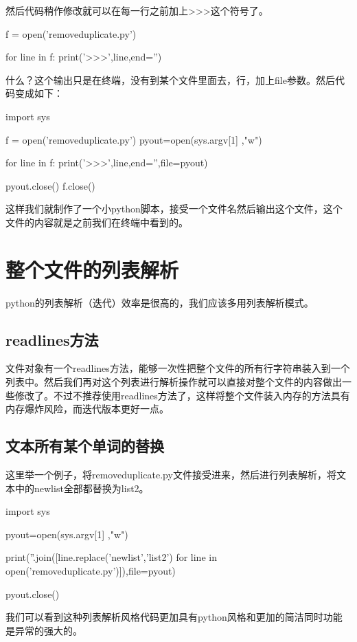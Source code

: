 \documentclass[12pt,oneside]{book}
\begin{document}
\begin{common-format}
然后代码稍作修改就可以在每一行之前加上>>>这个符号了。 
\begin{tcbpython}
f = open('removeduplicate.py')

for line in f:
    print('>>>',line,end='')
\end{tcbpython}

什么？这个输出只是在终端，没有到某个文件里面去，行，加上file参数。然后代码变成如下：
\begin{tcbpython}
import sys

f = open('removeduplicate.py')
pyout=open(sys.argv[1] ,"w")

for line in f:
    print('>>>',line,end='',file=pyout)

pyout.close()
f.close()
\end{tcbpython}
这样我们就制作了一个小python脚本，接受一个文件名然后输出这个文件，这个文件的内容就是之前我们在终端中看到的。

\section{整个文件的列表解析}
python的列表解析（迭代）效率是很高的，我们应该多用列表解析模式。

\subsection{readlines方法}
文件对象有一个readlines方法，能够一次性把整个文件的所有行字符串装入到一个列表中。然后我们再对这个列表进行解析操作就可以直接对整个文件的内容做出一些修改了。不过不推荐使用readlines方法了，这样将整个文件装入内存的方法具有内存爆炸风险，而迭代版本更好一点。

\subsection{文本所有某个单词的替换}
这里举一个例子，将removeduplicate.py文件接受进来，然后进行列表解析，将文本中的newlist全部都替换为list2。

\begin{tcbpython}
import sys

pyout=open(sys.argv[1] ,"w")

print(''.join([line.replace('newlist','list2') 
for line in open('removeduplicate.py')]),file=pyout)

pyout.close()
\end{tcbpython}

我们可以看到这种列表解析风格代码更加具有python风格和更加的简洁同时功能是异常的强大的。


\end{common-format}
\end{document}
